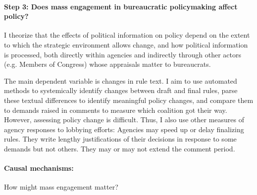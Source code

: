 





\paragraph{Step 3: Does mass engagement in bureaucratic policymaking affect policy?} I theorize that the effects of political information on policy depend on the extent to which the strategic environment allows change, and how political information is processed, both directly within agencies and indirectly through other actors (e.g. Members of Congress) whose appraisals matter to bureaucrats.

The main dependent variable is changes in rule text.
I aim to use automated methods to systemically identify changes between draft and final rules, parse these textual differences to identify meaningful policy changes, and compare them to demands raised in comments to measure which coalition got their way. However, assessing policy change is difficult. Thus, I also use other measures of agency responses to lobbying efforts: 
Agencies may speed up or delay finalizing rules. They write lengthy justifications of their decisions in response to some demands but not others. They may or may not extend the comment period.


\paragraph{Causal mechanisms:} How might mass engagement matter?

